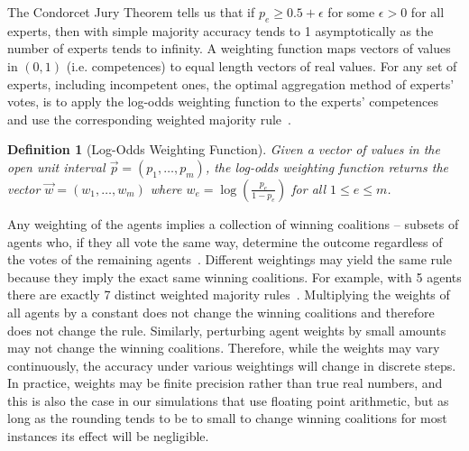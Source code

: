 \documentclass[letterpaper]{article} %
\newtheorem{definition}{Definition}
\newcommand{\expert}{\ensuremath{e} }
\begin{document}
The Condorcet Jury Theorem tells us that if $p_e \geq 0.5 + \epsilon$ for some $\epsilon > 0$ for all experts, then with simple majority accuracy tends to 1 asymptotically as the number of experts tends to infinity.
%
%
%
A weighting function maps vectors of values in $(0,1)$ (i.e. competences) to equal length vectors of real values.
%
For any set of experts, including incompetent ones, the optimal aggregation method of experts' votes, is to apply the log-odds weighting function to the experts' competences and use the corresponding weighted majority rule~\cite{shapley1984optimizing,nitzan1982optimal}.

\begin{definition}[Log-Odds Weighting Function]
Given a vector of values in the open unit interval $\vec{p} = (p_1, \ldots, p_m)$, the log-odds weighting function returns the vector $\vec{w} = (w_1, \ldots, w_m)$ where $w_\expert = \log(\frac{p_\expert}{1 - p_\expert})$ for all $1 \leq \expert \leq m$.
\end{definition}

Any weighting of the agents implies a collection of winning coalitions -- subsets of agents who, if they all vote the same way, determine the outcome regardless of the votes of the remaining agents~\cite{taylor1992characterization}. Different weightings may yield the same rule because they imply the exact same winning coalitions. For example, with 5 agents there are exactly 7 distinct weighted majority rules~\cite{karotkin1988essential,karotkin1994variability}. Multiplying the weights of all agents by a constant does not change the winning coalitions and therefore does not change the rule. Similarly, perturbing agent weights by small amounts may not change the winning coalitions. Therefore, while the weights may vary continuously, the accuracy under various weightings will change in discrete steps. In practice, weights may be finite precision rather than true real numbers, and this is also the case in our simulations that use floating point arithmetic, but as long as the rounding tends to be to small to change winning coalitions for most instances its effect will be negligible.
\end{document}
